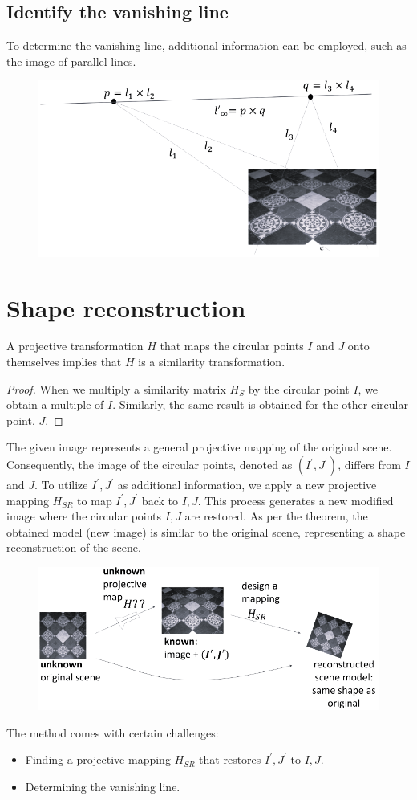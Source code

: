 \documentclass[12pt, a4paper]{report}
\begin{document}
    \subsection{Identify the vanishing line}
    To determine the vanishing line, additional information can be employed, such as the image of parallel lines.
    \begin{figure}[H]
        \centering
        \includegraphics[width=0.5\linewidth]{images/van.png}
    \end{figure}

    \section{Shape reconstruction}
    \begin{theorem}
        A projective transformation $H$ that maps the circular points $I$ and $J$ onto themselves implies that $H$ is a similarity transformation. 
    \end{theorem}
    \begin{proof}
        When we multiply a similarity matrix $H_S$ by the circular point $I$, we obtain a multiple of $I$.
        Similarly, the same result is obtained for the other circular point, $J$.
    \end{proof}
    The given image represents a general projective mapping of the original scene. 
    Consequently, the image of the circular points, denoted as $(I^{'},J^{'})$, differs from $I$ and $J$. 
    To utilize $I^{'},J^{'}$ as additional information, we apply a new projective mapping $H_{SR}$ to map $I^{'},J^{'}$ back to $I,J$. 
    This process generates a new modified image where the circular points $I,J$ are restored.
    As per the theorem, the obtained model (new image) is similar to the original scene, representing a shape reconstruction of the scene.
    \begin{figure}[H]
        \centering
        \includegraphics[width=0.75\linewidth]{images/HSR.png}
    \end{figure}
    The method comes with certain challenges:
    \begin{itemize}
        \item Finding a projective mapping $H_{SR}$ that restores $I^{'},J^{'}$ to $I,J$. 
        \item Determining the vanishing line.
    \end{itemize}
    
\end{document}
